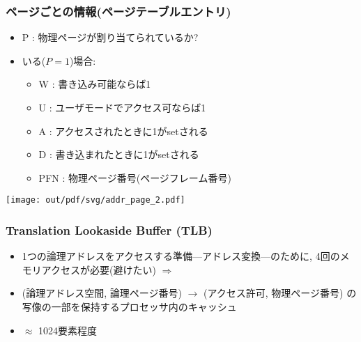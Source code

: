 \documentclass[12pt,dvipdfmx]{beamer}
\begin{document}
\begin{frame}
  \frametitle{ページごとの情報(ページテーブルエントリ)}
  \begin{itemize}
  \item P : 物理ページが割り当てられているか?
  \item いる($P = 1$)場合:
    \begin{itemize}
    \item W : 書き込み可能ならば1
    \item U : ユーザモードでアクセス可ならば1
    \item A : アクセスされたときに1がsetされる
    \item D : 書き込まれたときに1がsetされる
    \item PFN : 物理ページ番号(ページフレーム番号)
    \end{itemize}
  \end{itemize}
  
  \begin{center}
  \texttt{[image: out/pdf/svg/addr\_page\_2.pdf]}
  \end{center}
\end{frame}

\begin{frame}
  \frametitle{Translation Lookaside Buffer (TLB)}
  \begin{itemize}
  \item 1つの論理アドレスをアクセスする準備---アドレス変換---のために,
    4回のメモリアクセスが必要(避けたい)
    $\Rightarrow$ 
  \item
    (論理アドレス空間, 論理ページ番号) $\rightarrow$ (アクセス許可, 物理ページ番号)
    の写像の一部を保持するプロセッサ内のキャッシュ
  \item $\approx$ 1024要素程度
  \end{itemize}
\end{frame}
\end{document}
